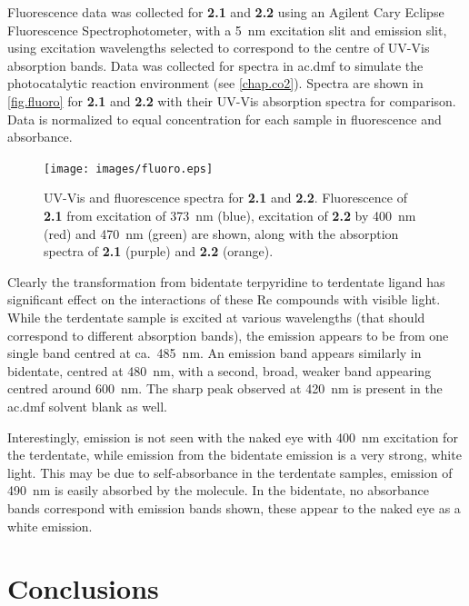 Fluorescence data was collected for \textbf{2.1} and \textbf{2.2} using an Agilent Cary Eclipse Fluorescence Spectrophotometer, with a 5~nm excitation slit and emission slit, using excitation wavelengths selected to correspond to the centre of UV-Vis absorption bands. Data was collected for spectra in \gls{ac.dmf} to simulate the photocatalytic reaction environment (see \autoref{chap.co2}). Spectra are shown in \autoref{fig.fluoro} for \textbf{2.1} and \textbf{2.2} with their UV-Vis absorption spectra for comparison. Data is normalized to equal concentration for each sample in fluorescence and absorbance.

\begin{figure}[!htb]
 \centering
  \texttt{[image: images/fluoro.eps]}
 \caption[UV-Vis and fluorescence spectra for \textbf{2.1} and \textbf{2.2}.]{UV-Vis and fluorescence spectra for \textbf{2.1} and \textbf{2.2}. Fluorescence of \textbf{2.1} from excitation of 373~nm (blue), excitation of \textbf{2.2} by 400~nm (red) and 470~nm (green) are shown, along with the absorption spectra of \textbf{2.1} (purple) and \textbf{2.2} (orange).}
 \label{fig.fluoro}
\end{figure}

Clearly the transformation from bidentate terpyridine to terdentate ligand has significant effect on the interactions of these Re compounds with visible light. While the terdentate sample is excited at various wavelengths (that should correspond to different absorption bands), the emission appears to be from one single band centred at ca.~485~nm. An emission band appears similarly in bidentate, centred at 480~nm, with a second, broad, weaker band appearing centred around 600~nm. The sharp peak observed at 420~nm is present in the \gls{ac.dmf} solvent blank as well.

Interestingly, emission is not seen with the naked eye with 400~nm excitation for the terdentate, while emission from the bidentate emission is a very strong, white light. This may be due to self-absorbance in the terdentate samples, emission of 490~nm is easily absorbed by the molecule. In the bidentate, no absorbance bands correspond with emission bands shown, these appear to the naked eye as a white emission.

\section{Conclusions}

